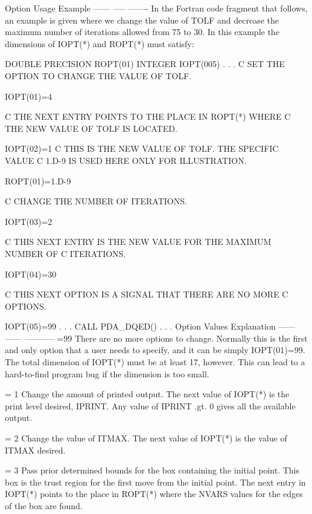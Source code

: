 \documentclass[11pt,twoside,nolof]{starlink}
\begin{document}
\begin{terminalv}
  Option Usage Example
  ------ ----- -------
  In  the  Fortran code fragment that follows, an example is given
  where  we  change  the  value  of  TOLF and decrease the maximum
  number  of  iterations  allowed  from  75  to 30.
  In this example the dimensions of IOPT(*) and ROPT(*) must
  satisfy:

        DOUBLE PRECISION ROPT(01)
        INTEGER IOPT(005)
        .
        .
        .
  C     SET THE OPTION TO CHANGE THE VALUE OF TOLF.

        IOPT(01)=4

  C     THE NEXT ENTRY POINTS TO THE PLACE IN ROPT(*) WHERE
  C     THE NEW VALUE OF TOLF IS LOCATED.

        IOPT(02)=1
  C     THIS IS THE NEW VALUE OF TOLF.  THE SPECIFIC VALUE
  C     1.D-9 IS USED HERE ONLY FOR ILLUSTRATION.

        ROPT(01)=1.D-9

  C     CHANGE THE NUMBER OF ITERATIONS.

        IOPT(03)=2

  C     THIS NEXT ENTRY IS THE NEW VALUE FOR THE MAXIMUM NUMBER OF
  C     ITERATIONS.

        IOPT(04)=30

  C     THIS NEXT OPTION IS A SIGNAL THAT THERE ARE NO MORE
  C     OPTIONS.

        IOPT(05)=99
        .
        .
        .
        CALL PDA_DQED()
        .
        .
        .
  Option Values   Explanation
  ------ ------   -----------
     =99          There are no more options to change.
                  Normally this is the first and only
                  option that a user needs to specify,
                  and it can be simply IOPT(01)=99.  The
                  total dimension of IOPT(*) must be at
                  least 17, however.  This can lead to a
                  hard-to-find program bug if the dimension
                  is too small.

     = 1          Change the amount of printed output.
                  The next value of IOPT(*) is the print
                  level desired, IPRINT.  Any value of
                  IPRINT .gt. 0 gives all the available
                  output.

     = 2          Change the value of ITMAX.  The next value
                  of IOPT(*) is the value of ITMAX desired.

     = 3          Pass prior determined bounds for the box
                  containing the initial point.  This box is the
                  trust region for the first move from the initial
                  point.  The next entry in IOPT(*) points to
                  the place in ROPT(*) where the NVARS values for
                  the edges of the box are found.


\end{terminalv}
\end{document}
